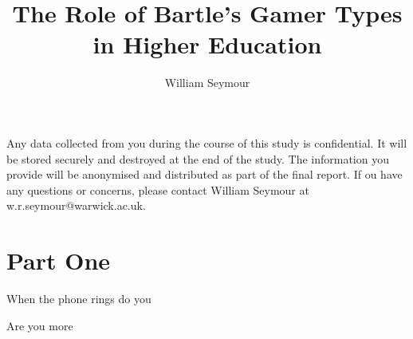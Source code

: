 \documentclass[english,pdf,pagemark,stamp,globalid=\candidateID]{sdaps}
\author{William Seymour}
\title{The Role of Bartle's Gamer Types in Higher Education}
\begin{document}
  \begin{questionnaire}
    \begin{info}
      Any data collected from you during the course of this study is confidential. It will be stored securely and destroyed at the end of the study. The information you provide will be anonymised and distributed as part of the final report. If ou have any questions or concerns, please contact William Seymour at w.r.seymour@warwick.ac.uk.
    \end{info}

    \section{Part One}

    \begin{choicequestion}[4]{When the phone rings do you}
    \end{choicequestion}
    \begin{choicequestion}[4]{Are you more}
    \end{choicequestion}

  \end{questionnaire}
\end{document}
